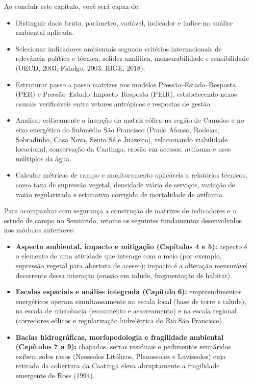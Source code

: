 \begin{capObjetivos}
Ao concluir este capítulo, você será capaz de:
\begin{itemize}[leftmargin=1.5em, itemsep=2.5pt]
  \item Distinguir dado bruto, parâmetro, variável, indicador e índice na análise ambiental aplicada.
  \item Selecionar indicadores ambientais segundo critérios internacionais de relevância política e técnica, solidez analítica, mensurabilidade e sensibilidade (OECD, 2003; Fidalgo, 2003; IBGE, 2018).
  \item Estruturar passo a passo matrizes nos modelos Pressão--Estado--Resposta (PER) e Pressão--Estado--Impacto--Resposta (PEIR), estabelecendo nexos causais verificáveis entre vetores antrópicos e respostas de gestão.
  \item Analisar criticamente a inserção da matriz eólica na região de Canudos e no eixo energético do Submédio São Francisco (Paulo Afonso, Rodelas, Sobradinho, Casa Nova, Sento Sé e Juazeiro), relacionando viabilidade locacional, conservação da Caatinga, erosão em acessos, avifauna e usos múltiplos da água.
  \item Calcular métricas de campo e monitoramento aplicáveis a relatórios técnicos, como taxa de supressão vegetal, densidade viária de serviços, variação de vazão regularizada e estimativa corrigida de mortalidade de avifauna.
\end{itemize}
\end{capObjetivos}

\begin{capRevisao}
Para acompanhar com segurança a construção de matrizes de indicadores e o estudo de campo no Semiárido, retome os seguintes fundamentos desenvolvidos nos módulos anteriores:
\begin{itemize}[leftmargin=1.5em, itemsep=2.5pt]
  \item \textbf{Aspecto ambiental, impacto e mitigação (Capítulos 4 e 5):} aspecto é o elemento de uma atividade que interage com o meio (por exemplo, supressão vegetal para abertura de acesso); impacto é a alteração mensurável decorrente dessa interação (erosão em talude, fragmentação de habitat).
  \item \textbf{Escalas espaciais e análise integrada (Capítulo 6):} empreendimentos energéticos operam simultaneamente na escala local (base de torre e talude), na escala de microbacia (escoamento e assoreamento) e na escala regional (corredores eólicos e regularização hidrelétrica do Rio São Francisco).
  \item \textbf{Bacias hidrográficas, morfopedologia e fragilidade ambiental (Capítulos 7 a 9):} chapadas, serras residuais e pedimentos semiáridos exibem solos rasos (Neossolos Litólicos, Planossolos e Luvissolos) cuja retirada da cobertura da Caatinga eleva abruptamente a fragilidade emergente de Ross (1994).
\end{itemize}
\end{capRevisao}

